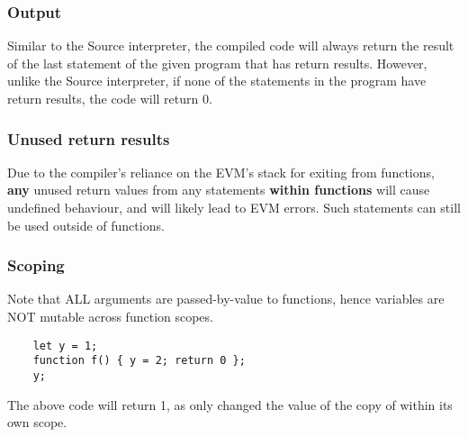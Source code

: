 \subsubsection{Output}
Similar to the Source interpreter, the compiled code will always return the result of the last statement of the given program that has return results. However, unlike the Source interpreter, if none of the statements in the program have return results, the code will return 0. 

\subsubsection{Unused return results}
Due to the compiler's reliance on the EVM's stack for exiting from functions, \textbf{any} unused return values from any statements \textbf{within functions} will cause undefined behaviour, and will likely lead to EVM errors. Such statements can still be used outside of functions.



\subsubsection{Scoping}
Note that ALL arguments are passed-by-value to functions, hence variables are NOT mutable across function scopes. 
\begin{verbatim}
    let y = 1;
    function f() { y = 2; return 0 };
    y;
\end{verbatim}
The above code will return 1, as  only changed the value of the copy of  within its own scope. 
\newpage
